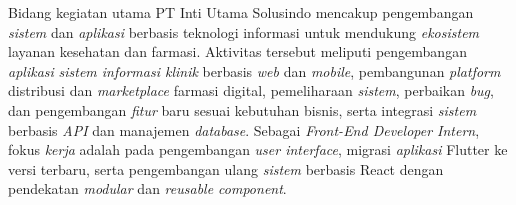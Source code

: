 \documentclass[12pt, a4paper]{article}
\begin{document}
Bidang kegiatan utama PT Inti Utama Solusindo mencakup pengembangan 
\textit{sistem} dan \textit{aplikasi} berbasis teknologi informasi untuk mendukung 
\textit{ekosistem} layanan kesehatan dan farmasi. Aktivitas tersebut meliputi 
pengembangan \textit{aplikasi} \textit{sistem informasi klinik} berbasis \textit{web} dan 
\textit{mobile}, pembangunan \textit{platform} distribusi dan \textit{marketplace} farmasi digital,
pemeliharaan \textit{sistem}, perbaikan \textit{bug}, dan pengembangan \textit{fitur} baru sesuai 
kebutuhan bisnis, serta integrasi \textit{sistem} berbasis \textit{API} dan manajemen 
\textit{database}. Sebagai \textit{Front-End Developer Intern}, fokus \textit{kerja} adalah 
pada pengembangan \textit{user interface}, migrasi \textit{aplikasi} Flutter ke versi 
terbaru, serta pengembangan ulang \textit{sistem} berbasis React dengan 
pendekatan \textit{modular} dan \textit{reusable component}.
\end{document}
